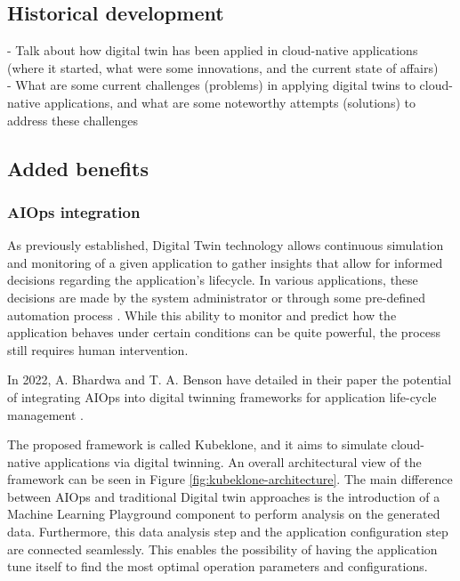 \subsection{Historical development}

- Talk about how digital twin has been applied in cloud-native applications (where it started, what were some innovations, and the current state of affairs) \\


- What are some current challenges (problems) in applying digital twins to cloud-native applications, and what are some noteworthy attempts (solutions) to address these challenges \\

\subsection{Added benefits}
\subsubsection{AIOps integration}

As previously established, Digital Twin technology allows continuous simulation and monitoring of a given application to gather insights that allow for informed decisions regarding the application's lifecycle. In various applications, these decisions are made by the system administrator or through some pre-defined automation process \cite{jiang_industrial_2021}. While this ability to monitor and predict how the application behaves under certain conditions can be quite powerful, the process still requires human intervention.

In 2022, A. Bhardwa and T. A. Benson have detailed in their paper the potential of integrating AIOps into digital twinning frameworks for application life-cycle management \cite{bhardwaj_kubeklone_2023}.

The proposed framework is called Kubeklone, and it aims to simulate cloud-native applications via digital twinning. An overall architectural view of the framework can be seen in Figure \ref{fig:kubeklone-architecture}. The main difference between AIOps and traditional Digital twin approaches is the introduction of a Machine Learning Playground component to perform analysis on the generated data. Furthermore, this data analysis step and the application configuration step are connected seamlessly. This enables the possibility of having the application tune itself to find the most optimal operation parameters and configurations.

